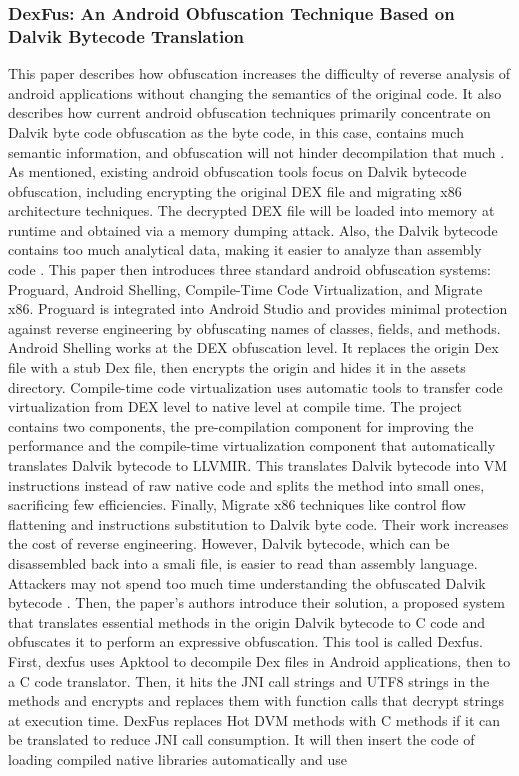 \documentclass[conference,a4paper]{IEEEtran}
\begin{document}
\subsubsection{DexFus: An Android Obfuscation Technique Based on Dalvik Bytecode Translation}
This paper describes how obfuscation increases the difficulty of reverse analysis of android applications without changing the semantics of the original code. It also describes how current android obfuscation techniques primarily concentrate on Dalvik byte code obfuscation as the byte code, in this case, contains much semantic information, and obfuscation will not hinder decompilation that much \cite{naitian_dexfus_2020}.
As mentioned, existing android obfuscation tools focus on Dalvik bytecode obfuscation, including encrypting the original DEX file and migrating x86 architecture techniques. The decrypted DEX file will be loaded into memory at runtime and obtained via a memory dumping attack. Also, the Dalvik bytecode contains too much analytical data, making it easier to analyze than assembly code \cite{naitian_dexfus_2020}.
This paper then introduces three standard android obfuscation systems: Proguard, Android Shelling, Compile-Time Code Virtualization, and Migrate x86. Proguard is integrated into Android Studio and provides minimal protection against reverse engineering by obfuscating names of classes, fields, and methods. Android Shelling works at the DEX obfuscation level. It replaces the origin Dex file with a stub Dex file, then encrypts the origin and hides it in the assets directory. Compile-time code virtualization uses automatic tools to transfer code virtualization from DEX level to native level at compile time. The project contains two components, the pre-compilation component for improving the performance and the compile-time virtualization component that automatically translates Dalvik bytecode to LLVMIR. This translates Dalvik bytecode into VM instructions instead of raw native code and splits the method into small ones, sacrificing few efficiencies. Finally, Migrate x86 techniques like control flow flattening and instructions substitution to Dalvik byte code. Their work increases the cost of reverse engineering. However, Dalvik bytecode, which can be disassembled back into a smali file, is easier to read than assembly language. Attackers may not spend too much time understanding the obfuscated Dalvik bytecode \cite{naitian_dexfus_2020}.
Then, the paper's authors introduce their solution, a proposed system that translates essential methods in the origin Dalvik bytecode to C code and obfuscates it to perform an expressive obfuscation. This tool is called Dexfus. First, dexfus uses Apktool to decompile Dex files in Android applications, then to a C code translator. Then, it hits the JNI call strings and UTF8 strings in the methods and encrypts and replaces them with function calls that decrypt strings at execution time. DexFus replaces Hot DVM methods with C methods if it can be translated to reduce JNI call consumption. It will then insert the code of loading compiled native libraries automatically and use
\end{document}
